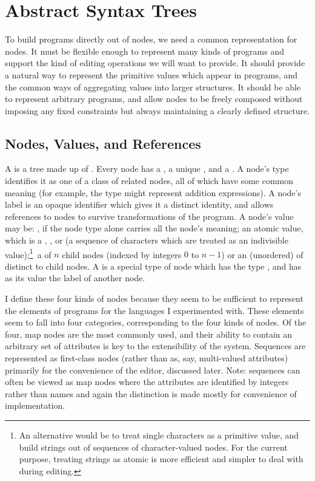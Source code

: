 \chapter{Abstract Syntax Trees}
\label{ASTs}
To build programs directly out of nodes, we need a common representation for nodes. It must be flexible enough to represent many kinds of programs and support the kind of editing operations we will want to provide. It should provide a natural way to represent the primitive values which appear in programs, and the common ways of aggregating values into larger structures. It should be able to represent arbitrary programs, and allow nodes to be freely composed without imposing any fixed constraints but always maintaining a clearly defined structure.


\section{Nodes, Values, and References}
A  is a tree made up of . Every node has a , a unique , and a . A node's type identifies it as one of a class of related nodes, all of which have some common meaning (for example, the type  might represent addition expressions). A node's label is an opaque identifier which gives it a distinct identity, and allows references to nodes to survive transformations of the program. A node's value may be: , if the node type alone carries all the node's meaning; an atomic value, which is a , , or  (a sequence of characters which are treated as an indivisible value);\footnote{An alternative would be to treat single characters as a primitive value, and build strings out of sequences of character-valued nodes. For the current purpose, treating strings as atomic is more efficient and simpler to deal with during editing.}\ a  of $n$ child nodes (indexed by integers $0$ to $n-1$) or an (unordered)  of distinct  to child nodes. A  is a special type of node which has the type , and has as its value the label of another node.

I define these four kinds of nodes because they seem to be sufficient to represent the elements of programs for the languages I experimented with. These elements seem to fall into four categories, corresponding to the four kinds of nodes. Of the four, map nodes are the most commonly used, and their ability to contain an arbitrary set of attributes is key to the extensibility of the system. Sequences are represented as first-class nodes (rather than as, say, multi-valued attributes) primarily for the convenience of the editor, discussed later. Note: sequences can often be viewed as map nodes where the attributes are identified by integers rather than names and again the distinction is made mostly for convenience of implementation. 

